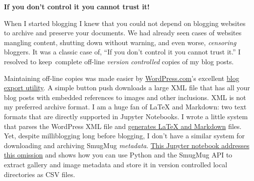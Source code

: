 \medskip
\noindent\textbf{If you don't control it you cannot trust it!}
\medskip

When I started blogging I knew that you could not depend on blogging
websites to archive and preserve your documents. We had already seen
cases of websites mangling content, shutting down without warning, and
even worse, \emph{censoring} bloggers. It was a classic case of, ``If
you don't control it you cannot trust it.'' I resolved to keep~complete
off-line \emph{version controlled} copies of my blog posts.

Maintaining off-line copies was made easier by
\href{https://wordpress.com/}{WordPress.com}'s excellent
\href{https://en.blog.wordpress.com/2006/06/12/xml-import-export/}{blog
export utility}. A simple button push downloads a large XML file that
has all your blog posts with embedded references to images and other
inclusions. XML is not my preferred archive format. I am a huge fan of
LaTeX and Markdown: two text formats that are directly supported in
Jupyter Notebooks. I wrote a little system that parses the WordPress XML
file and
\href{https://analyzethedatanotthedrivel.org/2012/02/11/wordpress-to-latex-with-pandoc-and-j-prerequisites-part-1/}{generates
LaTeX and Markdown} files. Yet, despite milliblogging long before
blogging, I don't have a similar system for downloading and archiving
SmugMug \emph{metadata}.
\href{https://github.com/bakerjd99/smugpyter/blob/master/notebooks/Downloading\%20Smugmug\%20Captions\%20with\%20Jupyter.ipynb}{This
Jupyter notebook addresses this omission} and shows how you can use
Python and the SmugMug API to extract gallery and image metadata and
store it in version controlled local directories as CSV files.



%
 
